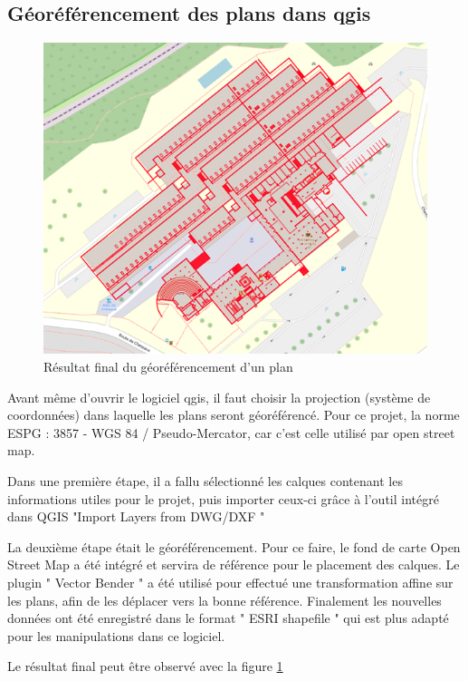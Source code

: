 \documentclass[
    iai, %
    il, %
]{heig-tb}
\begin{document}
\subsection{Géoréférencement des plans dans \gls{qgis}}
\begin{figure}[h]
    \centering
    \includegraphics[scale=0.5]{Géoréférencement.png}
    \caption{Résultat final du géoréférencement d'un plan}
    \label{fig:georeferencement}
\end{figure}

Avant même d'ouvrir le logiciel \gls{qgis}, il faut choisir la projection (système de coordonnées) dans laquelle les plans seront géoréférencé.
Pour ce projet, la norme ESPG : 3857 - WGS 84 / Pseudo-Mercator, car c'est celle utilisé par open street map.

Dans une première étape, il a fallu sélectionné les calques contenant les informations utiles pour le projet,
puis importer ceux-ci grâce à l'outil intégré dans QGIS "Import Layers from DWG/DXF "

La deuxième étape était le géoréférencement.
Pour ce faire, le fond de carte Open Street Map a été intégré et servira de référence pour le placement des calques.
Le plugin " Vector Bender " a été utilisé pour effectué une transformation affine sur les plans, afin de les déplacer vers la bonne référence.
Finalement les nouvelles données ont été enregistré dans le format " ESRI shapefile " qui est plus adapté pour les manipulations dans ce logiciel.

Le résultat final peut être observé avec la figure \ref{fig:georeferencement}
\end{document}
